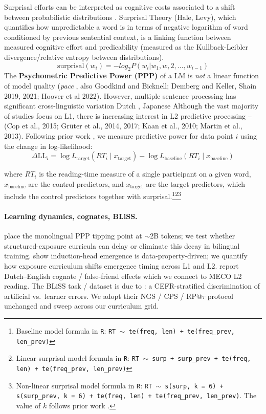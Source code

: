  Surprisal efforts can be interpreted as cognitive costs associated to a shift between probabilistic distributions \citep{de-varda-marelli-2022-effects}. Surprisal Theory (Hale, Levy), which quantifies how unpredictable a word is in terms of negative logarithm of word conditioned by previous sentential context, is a linking function between measured cognitive effort and predicability (measured as the Kullback-Leibler divergence/relative entropy between distributions).   \[\text{surprisal}(w_i) = - log_2 P(w_i |w_1, w,2, \dots, w_{i-1})\] The \textbf{Psychometric Predictive Power (PPP)} of a LM is \textit{not} a linear function of model quality (\textit{pace} \citet{de-varda-marelli-2022-effects}, also Goodkind and Bicknell; Demberg and Keller, Shain 2019, 2021; Hoover et al 2022).  However, multiple sentence processing has significant cross-linguistic variation \cite{hillert1998sentence} Dutch \cite{meister2021revisiting}, Japanese \citep{kuribayashi-etal-2021-lower} Although the vast majority of studies focus on L1, there is increasing interest in L2 predictive processing – (Cop et al., 2015; Grüter et al., 2014, 2017; Kaan et al., 2010; Martin et al., 2013).  Following prior work \citep{wilcox2020predictive, kaye2025sentence}, we measure predictive power for data point $i$ using the change in log-likelihood:
 \begin{equation}
 \Delta \mathrm{LL}_i =
 \log L_{\text{target}}(RT_i \mid x_{\text{target}})
 -
 \log L_{\text{baseline}}(RT_i \mid x_{\text{baseline}})
 \end{equation}

 where $RT_i$ is the reading-time measure of a single participant on a given word, $x_{\text{baseline}}$ are the control predictors, and $x_{\text{target}}$ are the target predictors, which include the control predictors together with surprisal.\footnote{Baseline model formula in \texttt{R}:
 \texttt{RT $\sim$ te(freq, len) + te(freq\_prev, len\_prev)}}\footnote{Linear surprisal model formula in \texttt{R}:
 \texttt{RT $\sim$ surp + surp\_prev + te(freq, len) + te(freq\_prev, len\_prev)}}\footnote{Non-linear surprisal model formula in \texttt{R}:
 \texttt{RT $\sim$ s(surp, k = 6) + s(surp\_prev, k = 6) + te(freq, len) + te(freq\_prev, len\_prev)}. The value of $k$ follows prior work \citep{wilcox2023}.}

\paragraph{Learning dynamics, cognates, BLiSS.} \citet{aoyama-wilcox-2025-language} place the monolingual PPP tipping point at $\sim$2B tokens; we test whether structured-exposure curricula can delay or eliminate this decay in bilingual training. \citet{aoyama2025predicting} show induction-head emergence is data-property-driven; we quantify how exposure curriculum shifts emergence timing across L1 and L2. \citet{frank2026dutch} report Dutch--English cognate / false-friend effects which we connect to MECO L2 reading. The BLiSS task / dataset is due to \citet{gao2025bliss}: a CEFR-stratified discrimination of artificial vs.\ learner errors. We adopt their NGS / CPS / RP$@\tau$ protocol unchanged and sweep across our curriculum grid.

